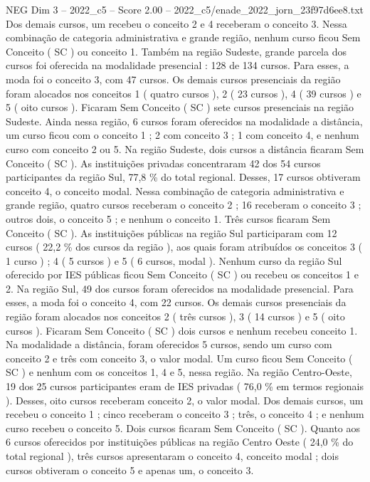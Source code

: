 \begin{textsample}{NEG Dim 3 – 2022\_c5 – Score 2.00 – 2022\_c5/enade\_2022\_jorn\_23f97d6ee8.txt}
Dos demais cursos, um recebeu o conceito 2 e 4 receberam o conceito 3.
Nessa combinação de categoria administrativa e grande região, nenhum curso ficou Sem Conceito ( SC ) ou conceito 1.
Também na região Sudeste, grande parcela dos cursos foi oferecida na modalidade presencial : 128 de 134 cursos.
Para esses, a moda foi o conceito 3, com 47 cursos.
Os demais cursos presenciais da região foram alocados nos conceitos 1 ( quatro cursos ), 2 ( 23 cursos ), 4 ( 39 cursos ) e 5 ( oito cursos ).
Ficaram Sem Conceito ( SC ) sete cursos presenciais na região Sudeste.
Ainda nessa região, 6 cursos foram oferecidos na modalidade a distância, um curso ficou com o conceito 1 ; 2 com conceito 3 ; 1 com conceito 4, e nenhum curso com conceito 2 ou 5.
Na região Sudeste, dois cursos a distância ficaram Sem Conceito ( SC ).
As instituições privadas concentraram 42 dos 54 cursos participantes da região Sul, 77,8 \% do total regional.
Desses, 17 cursos obtiveram conceito 4, o conceito modal.
Nessa combinação de categoria administrativa e grande região, quatro cursos receberam o conceito 2 ; 16 receberam o conceito 3 ; outros dois, o conceito 5 ; e nenhum o conceito 1.
Três cursos ficaram Sem Conceito ( SC ).
As instituições públicas na região Sul participaram com 12 cursos ( 22,2 \% dos cursos da região ), aos quais foram atribuídos os conceitos 3 ( 1 curso ) ; 4 ( 5 cursos ) e 5 ( 6 cursos, modal ).
Nenhum curso da região Sul oferecido por IES públicas ficou Sem Conceito ( SC ) ou recebeu os conceitos 1 e 2.
Na região Sul, 49 dos cursos foram oferecidos na modalidade presencial.
Para esses, a moda foi o conceito 4, com 22 cursos.
Os demais cursos presenciais da região foram alocados nos conceitos 2 ( três cursos ), 3 ( 14 cursos ) e 5 ( oito cursos ).
Ficaram Sem Conceito ( SC ) dois cursos e nenhum recebeu conceito 1.
Na modalidade a distância, foram oferecidos 5 cursos, sendo um curso com conceito 2 e três com conceito 3, o valor modal.
Um curso ficou Sem Conceito ( SC ) e nenhum com os conceitos 1, 4 e 5, nessa região.
Na região Centro-Oeste, 19 dos 25 cursos participantes eram de IES privadas ( 76,0 \% em termos regionais ).
Desses, oito cursos receberam conceito 2, o valor modal.
Dos demais cursos, um recebeu o conceito 1 ; cinco receberam o conceito 3 ; três, o conceito 4 ; e nenhum curso recebeu o conceito 5.
Dois cursos ficaram Sem Conceito ( SC ).
Quanto aos 6 cursos oferecidos por instituições públicas na região Centro Oeste ( 24,0 \% do total regional ), três cursos apresentaram o conceito 4, conceito modal ; dois cursos obtiveram o conceito 5 e apenas um, o conceito 3.

\end{textsample}
